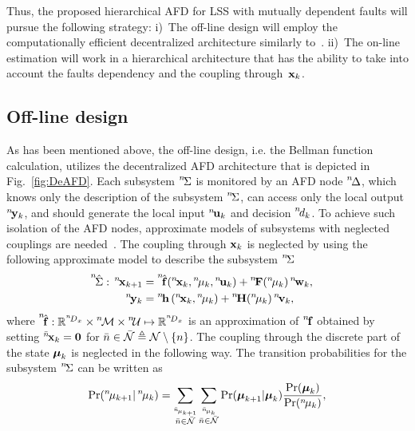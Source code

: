 \documentclass[conference,10pt]{IEEEtran}
\def\nth{\prescript{n\!}{}}
\def\bnth{\prescript{\bar{n}\!}{}}
\begin{document}
Thus, the proposed hierarchical AFD for LSS with mutually dependent faults will pursue the following strategy:
i)~The off-line design will employ the computationally efficient decentralized architecture similarly to~\cite{Puncochar2019:cp:ACC,Straka2019:cp:FUSION}.
ii)~The on-line estimation will work in a hierarchical architecture that has the ability to take into account the faults dependency and the coupling through~$\mathbf{x}_k$.
\subsection{Off-line design}\label{sec:off_line_design}
As has been mentioned above, the off-line design, i.e. the Bellman function calculation, utilizes the decentralized AFD architecture that is depicted in Fig.~\ref{fig:DeAFD}. 
Each subsystem $\nth{\Sigma}$ is monitored by an AFD node $\nth{\Delta}$, which knows only the description of the subsystem $\nth{\Sigma}$, can access only the local output $\nth{\bfy}_k$, and should generate the local input $\nth{\bfu}_{k}$ and decision $\nth{d}_{k}$. 
To achieve such isolation of the AFD nodes, approximate models of subsystems with neglected couplings are needed~\cite{Puncochar2019:cp:ACC}. 
The coupling through $\mathbf{x}_{k}$ is neglected by using the following approximate model to describe the subsystem $\nth{\Sigma}$
\begin{subequations}\label{ali:subsystemapprox}
	\begin{align}
		\label{ali:dynamicsapprox}
		\hspace{-1em}\nth{\hat{\Sigma}}:\,
		\nth{\bfx}_{k+1}&=\nth{\hat{\bff}}(\nth{\bfx}_{k},\nth{\mu}_{k},\nth{\bfu}_{k})+\nth{\bfF}(\nth{\mu}_k)\nth{\bfw}_k,\\
		\nth{\bfy}_{k} &= \nth{\bfh} \left(\nth{\bfx}_{k},\nth{\mu}_{k}\right) +
		\nth{\bfH}(\nth{\mu}_k)\nth{\bfv}_k,
	\end{align}
\end{subequations}
where $\nth{\hat{\bff}}:\bbR^{\nth{D}_{x}}\times\nth{\mcM}\times\nth{\mcU}\mapsto\bbR^{\nth{D}_{x}}$ is an approximation of $\nth{\bff}$ obtained by setting $\bnth{\bfx}_{k}=\bfZero$ for $\bar{n}\in\bar{\mathcal{N}}\triangleq\mathcal{N}\setminus\{n\}$. 
The coupling through the discrete part of the state $\boldsymbol{\mu}_{k}$ is neglected in the following way. 
The transition probabilities for the subsystem $\nth{\Sigma}$ can be written as
\begin{align}\label{ali:transitionapprox}
	\Pr(\nth{\mu}_{k+1}|\nth{\mu}_k)=\sum_{\stackrel{\bnth{\mu}_{k+1}}{\bar{n}\in\bar{\mcN}}}\sum_{\stackrel{\bnth{\mu}_k}{\bar{n}\in\bar{\mcN}}}\Pr(\bfmu_{k+1}|\bfmu_k)\frac{\Pr(\bfmu_k)}{\Pr(\nth{\mu}_k)},
\end{align}
\end{document}

